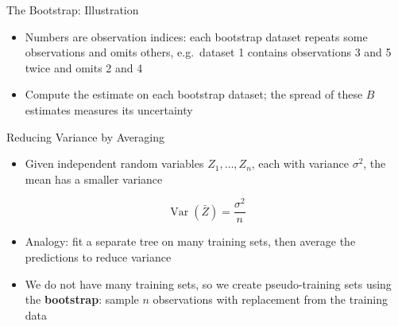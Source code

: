\begin{frame}{The Bootstrap: Illustration}
    \begin{center}
    \end{center}
    \begin{itemize}
        \item Numbers are observation indices: each bootstrap dataset repeats some observations and omits others, e.g.\ dataset 1 contains observations 3 and 5 twice and omits 2 and 4
        \item Compute the estimate on each bootstrap dataset; the spread of these $B$ estimates measures its uncertainty
    \end{itemize}
\end{frame}


\begin{frame}{Reducing Variance by Averaging}
    \begin{itemize}
        \item Given independent random variables $Z_1, \dots, Z_n$, each with variance $\sigma^2$, the mean has a smaller variance
    \end{itemize}
    \[
        \operatorname{Var}(\bar{Z}) = \frac{\sigma^2}{n}
    \]
    \begin{itemize}
        \item Analogy: fit a separate tree on many training sets, then average the predictions to reduce variance
        \item We do not have many training sets, so we create pseudo-training sets using the \textbf{bootstrap}: sample $n$ observations with replacement from the training data
    \end{itemize}
\end{frame}


